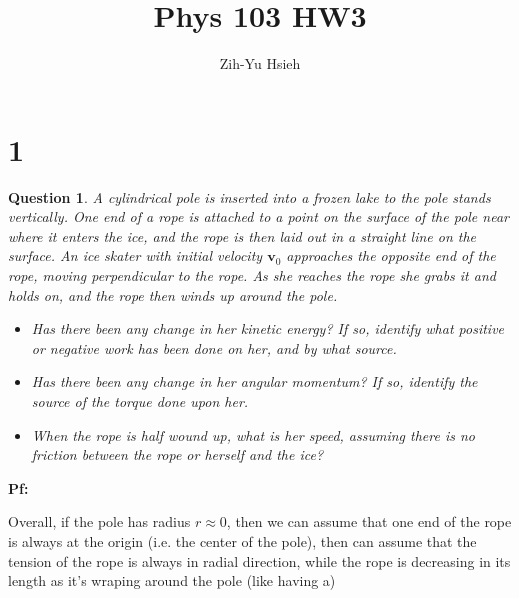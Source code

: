 \documentclass{article}
\title{Phys 103 HW3}
\author{Zih-Yu Hsieh}
\newtheorem{question}{Question}
\newcommand{\bv}{\textbf{v}} %
\begin{document}
\maketitle

\section*{1}
\begin{question}\label{q1}
    A cylindrical pole is inserted into a frozen lake to the pole stands vertically. One end of a rope is attached to a point on the surface of the pole near where it enters the ice, and the rope is then laid out in a straight line on the surface. An ice skater with initial velocity $\bv_0$ approaches the opposite end of the rope, moving perpendicular to the rope. As she reaches the rope she grabs it and holds on, and the rope then winds up around the pole.
    \begin{itemize}
        \item[(a)] Has there been any change in her kinetic energy? If so, identify what positive or negative work has been done on her, and by what source.
        \item[(b)] Has there been any change in her angular momentum? If so, identify the source of the torque done upon her.
        \item[(c)] When the rope is half wound up, what is her speed, assuming there is no friction between the rope or herself and the ice?
    \end{itemize}
\end{question}

\textbf{Pf:}

Overall, if the pole has radius $r\approx 0$, then we can assume that one end of the rope is always at the origin (i.e. the center of the pole), then can assume that the tension of the rope is always in radial direction, while the rope is decreasing in its length as it's wraping around the pole (like having a)

\break
\end{document}
